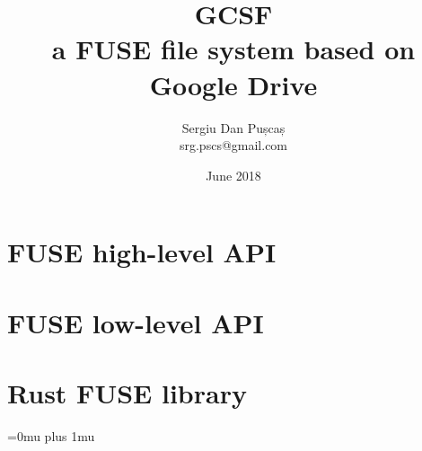 \documentclass[a4paper,12pt,titlepage,openany]{book}
\title{%
GCSF \\
\large a FUSE file system based on Google Drive}
\author{Sergiu Dan Pușcaș \\ srg.pscs@gmail.com}
\date{June 2018}
\begin{document}

\maketitle
\tableofcontents







\begin{appendices}
\chapter{FUSE high-level API} \label{appendix:fuse_high_level}


\chapter{FUSE low-level API} \label{appendix:fuse_low_level}


\chapter{Rust FUSE library} \label{appendix:rust_fuse}

\end{appendices}

\Urlmuskip=0mu plus 1mu\relax


\end{document}

